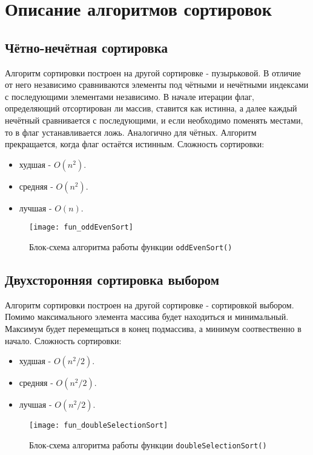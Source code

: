 \section{Описание алгоритмов сортировок}

\subsection{Чётно-нечётная сортировка}
Алгоритм сортировки построен на другой сортировке - пузырьковой. В отличие от него независимо
сравниваются элементы под чётными и нечётными индексами с последующими элементами независимо.
В начале итерации флаг, определяющий отсортирован ли массив, ставится как истинна, а далее каждый
нечётный сравнивается с последующими, и если необходимо поменять местами, то в флаг устанавливается
ложь. Аналогично для чётных. Алгоритм прекращается, когда флаг остаётся истинным. Сложность сортировки:
\begin{itemize}
  \item худшая - $O(n^2)$.
  \item средняя - $O(n^2)$.
  \item лучшая - $O(n)$.
\end{itemize}

\begin{figure}[H]
  \centering
  \texttt{[image: fun\_oddEvenSort]}
  \caption{Блок-схема алгоритма работы функции \texttt{oddEvenSort()}}
\end{figure}

\subsection{Двухсторонняя сортировка выбором}

Алгоритм сортировки построен на другой сортировке - сортировкой выбором. Помимо максимального
элемента массива будет находиться и минимальный. Максимум будет перемещаться в конец подмассива,
а минимум соотвественно в начало. Сложность сортировки:

\begin{itemize}
  \item худшая - $O(n^2 / 2)$.
  \item средняя - $O(n^2 / 2)$.
  \item лучшая - $O(n^2 / 2)$.
\end{itemize}

\begin{figure}[H]
  \centering
  \texttt{[image: fun\_doubleSelectionSort]}
  \caption{Блок-схема алгоритма работы функции \texttt{doubleSelectionSort()}}
\end{figure}
